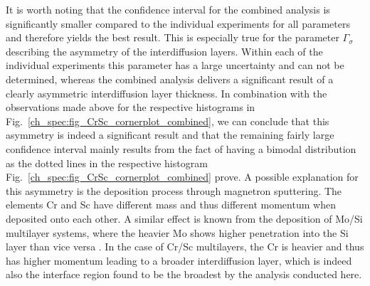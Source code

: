 It is worth noting that the confidence interval for the combined analysis is 
significantly smaller compared to the individual experiments for all parameters and therefore yields the best result. This is especially true for the parameter $\Gamma_\sigma$ describing the asymmetry of the interdiffusion layers. Within each of the individual experiments this parameter has a large uncertainty and can not be determined, whereas the combined analysis delivers a significant result of a clearly asymmetric interdiffusion layer thickness. In combination with the observations made above for the respective histograms in Fig.~\ref{ch_spec:fig_CrSc_cornerplot_combined}, we can conclude that this asymmetry is indeed a significant result and that the remaining fairly large confidence interval mainly results from the fact of having a bimodal distribution as the dotted lines in the respective histogram Fig.~\ref{ch_spec:fig_CrSc_cornerplot_combined} prove. A possible explanation for this asymmetry is the deposition process through magnetron sputtering. The elements Cr and Sc have different mass and thus different momentum when deposited onto each other. A similar effect is known from the deposition of Mo/Si multilayer systems, where the heavier Mo shows higher penetration into the Si layer than vice versa \cite{petford-long_highresolution_1987}. In the case of Cr/Sc multilayers, the Cr is heavier and thus has higher momentum leading to a broader interdiffusion layer, which is indeed also the interface region found to be the broadest by the analysis conducted here.

